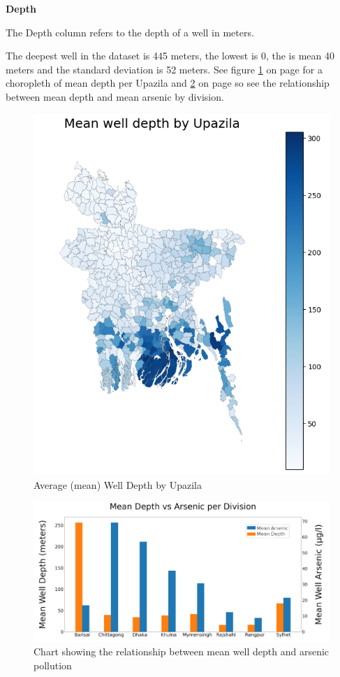 \textbf{Depth}

The Depth column refers to the depth of a well in meters.

The deepest well in the dataset is 445 meters, the lowest is 0, the is mean 40 meters and the standard deviation is 52 meters. See figure \ref{fig:x avg_depth} on page \pageref{fig:x avg_depth} for a choropleth of mean depth per Upazila and \ref{fig:x dva} on page \pageref{fig:x dva} so see the relationship between mean depth and mean arsenic by division.

\begin{figure}[!htb]
    \centering
    \includegraphics[scale=0.54]{figures/mean_well_depth_by_upa.png} 
    \caption{Average (mean) Well Depth by Upazila}
    \label{fig:x avg_depth}
\end{figure}

\begin{figure}[!htb]
    \centering
    \includegraphics[scale=0.28]{figures/mean_as_vs_depth.png} 
    \caption{Chart showing the relationship between mean well depth and arsenic pollution}
    \label{fig:x dva}
\end{figure}

